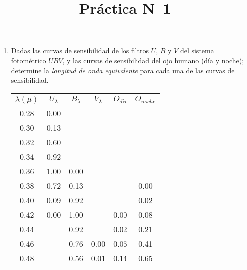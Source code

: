 \documentclass[10pt,spanish,a4paper,1p]{practice}
\begin{document}
  \title{Práctica N\textdegree\ 1}
  \maketitle

  \begin{enumerate}[wide, labelwidth=!, labelindent=0pt, label=\textbf{\textrm{\arabic*)}}, ref=\arabic*]
    \item \label{prob:1} Dadas las curvas de sensibilidad de los filtros $U$, $B$ y $V$ del sistema fotométrico $UBV$, y las curvas de sensibilidad del ojo humano (día y noche); determine la \emph{longitud de onda equivalente} para cada una de las curvas de sensibilidad.

      \begin{table}[h!]
        \centering
        \begin{tabular}{ c | c | c | c | c | c }
          $\lambda(\mu)$ & $U_\lambda$ & $B_\lambda$ & $V_\lambda$ & $O_{\textit{d\'ia}}$ & $O_{noche}$ \\\hline
          0.28           & 0.00        &             &             &                   &      \\
          0.30           & 0.13        &             &             &                   &      \\
          0.32           & 0.60        &             &             &                   &      \\
          0.34           & 0.92        &             &             &                   &      \\
          0.36           & 1.00        & 0.00        &             &                   &      \\
          0.38           & 0.72        & 0.13        &             &                   & 0.00 \\
          0.40           & 0.09        & 0.92        &             &                   & 0.02 \\
          0.42           & 0.00        & 1.00        &             & 0.00              & 0.08 \\
          0.44           &             & 0.92        &             & 0.02              & 0.21 \\
          0.46           &             & 0.76        & 0.00        & 0.06              & 0.41 \\
          0.48           &             & 0.56        & 0.01        & 0.14              & 0.65 \\

\end{tabular}
\end{table}
\end{enumerate}
\end{document}
